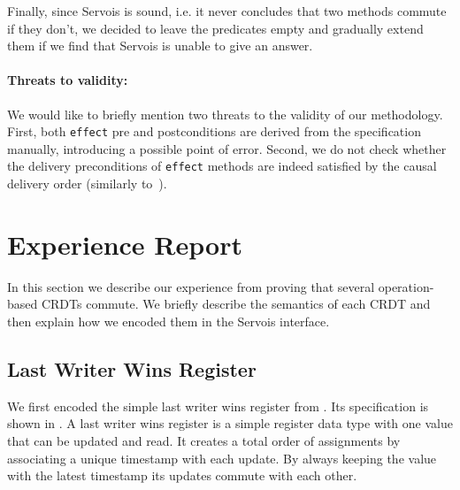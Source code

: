 \documentclass{article}
\newcommand{\TODO}[1]{\hl{\textbf{TODO:} #1}\xspace}
\begin{document}


Finally, since Servois is sound, i.e. it never concludes that two
methods commute if they don't, we decided to leave the predicates
empty and gradually extend them if we find that Servois is unable to
give an answer.

\paragraph{Threats to validity:} 

We would like to briefly mention two threats to the validity of our
methodology. First, both \texttt{effect} pre and postconditions are
derived from the specification manually, introducing a possible point
of error. Second, we do not check whether the delivery preconditions
of \texttt{effect} methods are indeed satisfied by the causal delivery
order (similarly to~\cite{shapiro2011conflict}).


\section{Experience Report}

In this section we describe our experience from proving that several
operation-based CRDTs commute. We briefly describe the semantics of
each CRDT and then explain how we encoded them in the Servois
interface.

\subsection{Last Writer Wins Register}

We first encoded the simple last writer wins register from
\cite{shapiro2011comprehensive}. Its specification is shown in
. A last writer wins register is a simple register
data type with one value that can be updated and read. It creates a
total order of assignments by associating a unique timestamp with each
update. By always keeping the value with the latest timestamp its
updates commute with each other.
\end{document}
